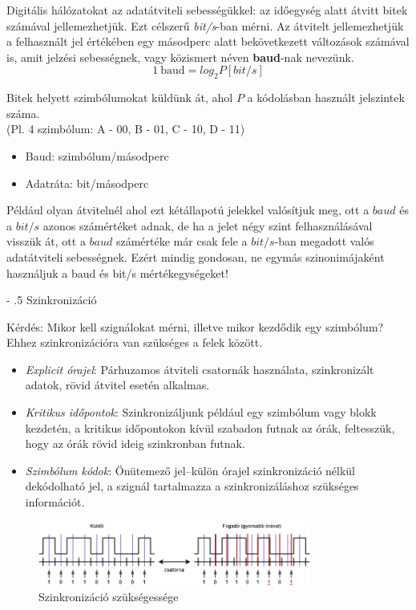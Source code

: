 \documentclass[12pt]{article}
\makeatletter
\renewcommand\paragraph{%
	\@startsection{paragraph}{4}{0mm}%
	{-\baselineskip}%
	{.5\baselineskip}%
	{\normalfont\normalsize\bfseries}}
\makeatother
\begin{document}
    Digitális hálózatokat az adatátviteli sebességükkel: az időegység alatt átvitt bitek számával jellemezhetjük. Ezt célszerű \emph{bit/s}-ban mérni. Az átvitelt jellemezhetjük a felhasznált jel értékében egy másodperc alatt bekövetkezett változások számával is, amit jelzési sebességnek, vagy közismert néven \textbf{baud}-nak nevezünk.
    \[
        1\ \text{baud} = log_{2}P[bit/s]
    \]

	\noindent Bitek helyett szimbólumokat küldünk át, ahol $P$ a kódolásban használt jelszintek száma.\\
    (Pl. 4 szimbólum: A - 00, B - 01, C - 10, D - 11)
    \begin{itemize}[leftmargin=7.5mm]
        \renewcommand{\labelitemi}{$\vcenter{\hbox{\tiny$\bullet$}}$}
        \item Baud: szimbólum/másodperc
        \item Adatráta: bit/másodperc\\
    \end{itemize}

    \noindent Például olyan átvitelnél ahol ezt kétállapotú jelekkel valósítjuk meg, ott a $baud$ és a $bit/s$ azonos számértéket adnak, de ha a jelet négy szint felhasználásával visszük át, ott a $baud$ számértéke már csak fele a $bit/s$-ban megadott valós adatátviteli sebességnek. Ezért mindig gondosan, ne egymás szinonimájaként használjuk a baud és bit/s mértékegységeket!

	\paragraph{Szinkronizáció\\}

	Kérdés: Mikor kell szignálokat mérni, illetve mikor kezdődik egy szimbólum? \\
    Ehhez szinkronizációra van szükséges a felek között.
    \begin{itemize}[leftmargin=7.5mm]
        \renewcommand{\labelitemi}{$\vcenter{\hbox{\tiny$\bullet$}}$}
        \item \emph{Explicit órajel}: Párhuzamos átviteli csatornák használata, szinkronizált adatok, rövid átvitel esetén alkalmas.
        \item \emph{Kritikus időpontok}: Szinkronizáljunk például egy szimbólum vagy blokk kezdetén, a kritikus időpontokon kívül szabadon futnak az órák, feltesszük, hogy az órák rövid ideig szinkronban futnak.
        \item \emph{Szimbólum kódok}: Önütemező jel–külön órajel szinkronizáció nélkül dekódolható jel, a szignál tartalmazza a szinkronizáláshoz szükséges információt.
	\end{itemize}
	\begin{figure}[H]
		\centering
		\includegraphics[width=0.8\textwidth]{img/szinkronizacio.png}
		\caption{Szinkronizáció szükségessége}
	\end{figure}
\end{document}
